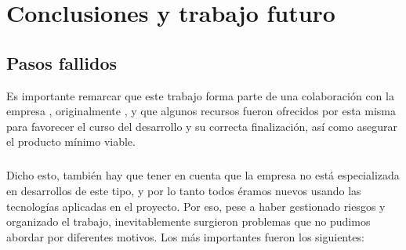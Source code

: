 \documentclass{subfiles}
\begin{document}
    \chapter{Conclusiones y trabajo futuro}
    \label{chap:conclusiones_y_futuros_pasos}

    \section{Pasos fallidos}
    \label{sec:pasos_fallidos}
    
    Es importante remarcar que este trabajo forma parte de una colaboración con la empresa \thirdera, originalmente \silverstorm, y que algunos recursos fueron ofrecidos por esta misma para favorecer el curso del desarrollo y su correcta finalización, así como asegurar el producto mínimo viable.

    \paragraph{}
    Dicho esto, también hay que tener en cuenta que la empresa no está especializada en desarrollos de este tipo, y por lo tanto todos éramos nuevos usando las tecnologías aplicadas en el proyecto. Por eso, pese a haber gestionado riesgos y organizado el trabajo, inevitablemente surgieron problemas que no pudimos abordar por diferentes motivos. Los más importantes fueron los siguientes:
\end{document}

